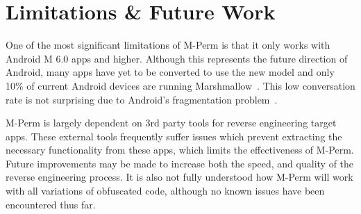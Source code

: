 \documentclass{sig-alternate-05-2015}
\begin{document}






%







%




\section{Limitations \& Future Work}
\label{sec: limitations}

One of the most significant limitations of M-Perm is that it only works with Android M 6.0 apps and higher. Although this represents the future direction of Android, many apps have yet to be converted to use the new model and only 10\% of current Android devices are running Marshmallow~\cite{Mars_Adoption_10_URL}. This low conversation rate is not surprising due to Android's fragmentation problem~\cite{acar2016sok}.

M-Perm is largely dependent on 3rd party tools for reverse engineering target apps. These external tools frequently suffer issues which prevent extracting the necessary functionality from these apps, which limits the effectiveness of M-Perm. Future improvements may be made to increase both the speed, and quality of the reverse engineering process. It is also not fully understood how M-Perm will work with all variations of obfuscated code, although no known issues have been encountered thus far.
\end{document}

